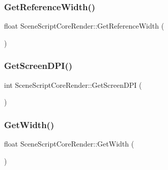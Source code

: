 \hypertarget{class_scene_script_core_render_a66038811c5d4b144ed88db6484ee2f19}{}\label{class_scene_script_core_render_a66038811c5d4b144ed88db6484ee2f19} 
\subsubsection{\texorpdfstring{Get\+Reference\+Width()}{GetReferenceWidth()}}
{\footnotesize\ttfamily float Scene\+Script\+Core\+Render\+::\+Get\+Reference\+Width (\begin{DoxyParamCaption}{ }\end{DoxyParamCaption})}

\hypertarget{class_scene_script_core_render_ab0e48e05342db528716a0c87f9758e76}{}\label{class_scene_script_core_render_ab0e48e05342db528716a0c87f9758e76} 
\subsubsection{\texorpdfstring{Get\+Screen\+D\+P\+I()}{GetScreenDPI()}}
{\footnotesize\ttfamily int Scene\+Script\+Core\+Render\+::\+Get\+Screen\+D\+PI (\begin{DoxyParamCaption}{ }\end{DoxyParamCaption})}

\hypertarget{class_scene_script_core_render_a9ae50d6cc542a2a244de6d4988462f50}{}\label{class_scene_script_core_render_a9ae50d6cc542a2a244de6d4988462f50} 
\subsubsection{\texorpdfstring{Get\+Width()}{GetWidth()}}
{\footnotesize\ttfamily float Scene\+Script\+Core\+Render\+::\+Get\+Width (\begin{DoxyParamCaption}{ }\end{DoxyParamCaption})}

\hypertarget{class_scene_script_core_render_a32de8aefc151c085d917b90b8f0d08ba}{}\label{class_scene_script_core_render_a32de8aefc151c085d917b90b8f0d08ba} 

